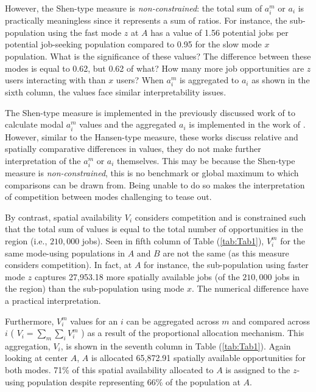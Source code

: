 \documentclass[numbered]{trbunofficial}
\begin{document}
However, the Shen-type measure is \emph{non-constrained}: the total sum
of \(a_i^m\) or \(a_i\) is practically meaningless since it represents a
sum of ratios. For instance, the sub-population using the fast mode
\(z\) at \(A\) has a value of 1.56 potential jobs per potential
job-seeking population compared to 0.95 for the slow mode \(x\)
population. What is the significance of these values? The difference
between these modes is equal to 0.62, but 0.62 of what? How many more
job opportunities are \(z\) users interacting with than \(x\) users?
When \(a_i^m\) is aggregated to \(a_i\) as shown in the sixth column,
the values face similar interpretability issues.

The Shen-type measure is implemented in the previously discussed work of
\citet{taoInvestigatingImpactsPublic2020a} to calculate modal \(a_i^m\)
values and the aggregated \(a_i\) is implemented in the work of
\citet{carpentieriMultimodalAccessibilityPrimary2020}. However, similar
to the Hansen-type measure, these works discuss relative and spatially
comparative differences in values, they do not make further
interpretation of the \(a_i^m\) or \(a_i\) themselves. This may be
because the Shen-type measure is \emph{non-constrained}, this is no
benchmark or global maximum to which comparisons can be drawn from.
Being unable to do so makes the interpretation of competition between
modes challenging to tease out.

By contrast, spatial availability \(V_i\) considers competition and is
constrained such that the total sum of values is equal to the total
number of opportunities in the region (i.e., \(210,000\) jobs). Seen in
fifth column of Table (\ref{tab:Tab1}), \(V_i^m\) for the same
mode-using populations in \(A\) and \(B\) are not the same (as this
measure considers competition). In fact, at \(A\) for instance, the
sub-population using faster mode \(z\) captures 27,953.18 more spatially
available jobs (of the \(210,000\) jobs in the region) than the
sub-population using mode \(x\). The numerical difference have a
practical interpretation.

Furthermore, \(V_i^m\) values for an \(i\) can be aggregated across
\(m\) and compared across \(i\) ( \(V_i = \sum_m{\sum_i{V_i^m}}\) ) as a
result of the proportional allocation mechanism. This aggregation,
\(V_i\), is shown in the seventh column in Table (\ref{tab:Tab1}). Again
looking at center \(A\), \(A\) is allocated 65,872.91 spatially
available opportunities for both modes. 71\% of this spatial
availability allocated to \(A\) is assigned to the \(z\)-using
population despite representing 66\% of the population at \(A\).
\end{document}
